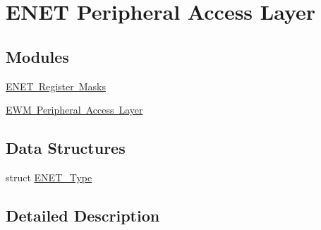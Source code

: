\hypertarget{group___e_n_e_t___peripheral___access___layer}{}\section{E\+N\+ET Peripheral Access Layer}
\label{group___e_n_e_t___peripheral___access___layer}
\subsection*{Modules}
\begin{DoxyCompactItemize}
\item 
\mbox{\hyperlink{group___e_n_e_t___register___masks}{E\+N\+E\+T Register Masks}}
\item 
\mbox{\hyperlink{group___e_w_m___peripheral___access___layer}{E\+W\+M Peripheral Access Layer}}
\end{DoxyCompactItemize}
\subsection*{Data Structures}
\begin{DoxyCompactItemize}
\item 
struct \mbox{\hyperlink{struct_e_n_e_t___type}{E\+N\+E\+T\+\_\+\+Type}}
\end{DoxyCompactItemize}


\subsection{Detailed Description}
